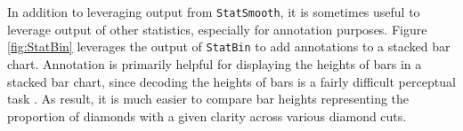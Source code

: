 \documentclass[
  12pt,
]{krantz}
\newenvironment{Shaded}{\begin{snugshade}}{\end{snugshade}}
\newcommand{\DataTypeTok}[1]{\textcolor[rgb]{0.13,0.29,0.53}{#1}}
\newcommand{\DecValTok}[1]{\textcolor[rgb]{0.00,0.00,0.81}{#1}}
\newcommand{\FloatTok}[1]{\textcolor[rgb]{0.00,0.00,0.81}{#1}}
\newcommand{\KeywordTok}[1]{\textcolor[rgb]{0.13,0.29,0.53}{\textbf{#1}}}
\newcommand{\NormalTok}[1]{#1}
\newcommand{\OperatorTok}[1]{\textcolor[rgb]{0.81,0.36,0.00}{\textbf{#1}}}
\newcommand{\OtherTok}[1]{\textcolor[rgb]{0.56,0.35,0.01}{#1}}
\newcommand{\StringTok}[1]{\textcolor[rgb]{0.31,0.60,0.02}{#1}}
\begin{document}
In addition to leveraging output from \texttt{StatSmooth}, it is sometimes useful to leverage output of other statistics, especially for annotation purposes. Figure \ref{fig:StatBin} leverages the output of \texttt{StatBin} to add annotations to a stacked bar chart. Annotation is primarily helpful for displaying the heights of bars in a stacked bar chart, since decoding the heights of bars is a fairly difficult perceptual task \citep{graphical-perception}. As result, it is much easier to compare bar heights representing the proportion of diamonds with a given clarity across various diamond cuts.


\begin{Shaded}
\end{Shaded}
\end{document}
